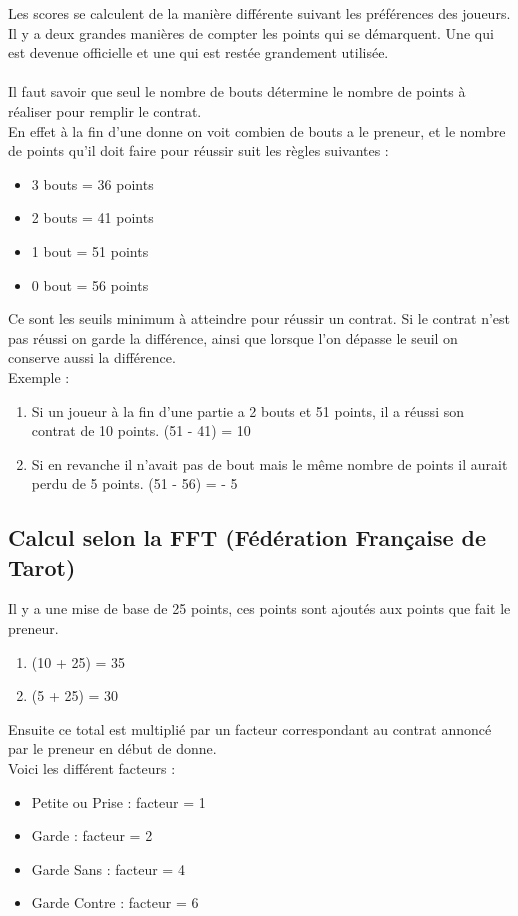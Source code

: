 \documentclass[a4paper]{report}
\begin{document}
		Les scores se calculent de la manière différente suivant les préférences des joueurs.\\
		Il y a deux grandes manières de compter les points qui se démarquent. Une qui est devenue officielle et une qui est restée grandement utilisée.\\
		\\ 
		Il faut savoir que seul le nombre de bouts détermine le nombre de points à réaliser pour remplir le contrat.\\
		En effet à la fin d’une donne on voit combien de bouts a le preneur, et le nombre de points qu’il doit faire pour réussir suit les règles suivantes :\\
		\begin{itemize}
		    \item 3 bouts = 36 points
		    \item 2 bouts = 41 points
		    \item 1 bout = 51 points
		    \item 0 bout = 56 points
		\end{itemize}

		Ce sont les seuils minimum à atteindre pour réussir un contrat. Si le contrat n’est pas réussi on garde la différence, ainsi que lorsque l’on dépasse le seuil on conserve aussi 			la différence.\\

		Exemple :
		\begin{enumerate}

			\item Si un joueur à la fin d’une partie a 2 bouts et 51 points, il a réussi son contrat de 10 points.
		    		(51 - 41)  = 10
			\item Si en revanche il n’avait pas de bout mais le même nombre de points il aurait perdu de 5 points.
		    		(51 - 56) = - 5
		\end{enumerate}
			\subsection{Calcul selon la FFT (Fédération Française de Tarot)}
				Il y a une mise de base de 25 points, ces points sont ajoutés aux points que fait le preneur.\\
			\begin{enumerate}
				\item(10 + 25) = 35
				\item(5 + 25) = 30
			\end{enumerate}

			Ensuite ce total est multiplié par un facteur correspondant au contrat annoncé par le preneur en début de donne.\\
				Voici les différent facteurs :\\
				\begin{itemize}
					\item Petite ou Prise : facteur = 1
				   	\item Garde : facteur = 2
				    	\item Garde Sans : facteur = 4
				    	\item Garde Contre : facteur = 6
				\end{itemize}
\end{document}

